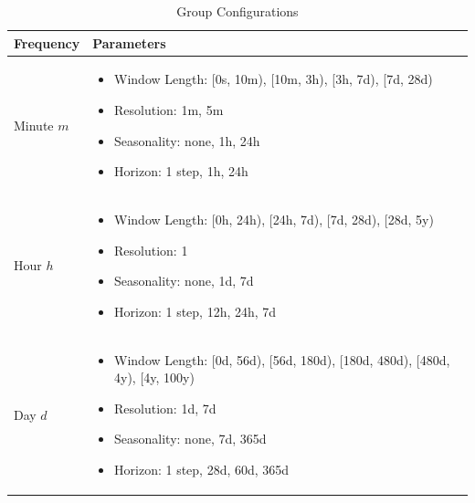\begin{table}
  \fontsize{8.5pt}{8.5pt}\selectfont
  \caption{Group Configurations}
  \centering
  \begin{tabular}{p{3cm}|p{11.2cm}}
     
     Frequency & Parameters\\
     
     \hline
     \vspace{.01cm}
     Minute $m$ & 
     \vspace{-.5cm}
     \begin{itemize}
         \setlength\itemsep{0cm}
         \item Window Length: [0s, 10m), [10m, 3h), [3h, 7d), [7d, 28d)
         \item Resolution: 1m, 5m
         \item Seasonality: none, 1h, 24h
         \item Horizon: 1 step, 1h, 24h
     \end{itemize}  \\
     \hline
     
     \vspace{.01cm}
     Hour $h$ & 
     \vspace{-.5cm}
     \begin{itemize}
         \setlength\itemsep{0cm}
         \item Window Length: [0h, 24h), [24h, 7d), [7d, 28d), [28d, 5y)
         \item Resolution: 1
         \item Seasonality: none, 1d, 7d
         \item Horizon: 1 step, 12h, 24h, 7d
     \end{itemize}  \\
     \hline
     
     \vspace{.01cm}
     Day $d$ & 
     \vspace{-.5cm}
     \begin{itemize}
         \setlength\itemsep{0cm}
         \item Window Length: [0d, 56d), [56d, 180d), [180d, 480d), [480d, 4y), [4y, 100y)
         \item Resolution: 1d, 7d
         \item Seasonality: none, 7d, 365d
         \item Horizon: 1 step, 28d, 60d, 365d
     \end{itemize}  \\
     \hline
     

\end{tabular}
\end{table}
